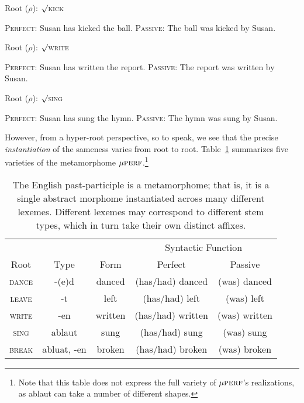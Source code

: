 \begin{exe}
\label{ex:pastpart}
	\ex Root ($\rho$): $\surd$\textsc{kick}
		\begin{xlist} \label{ex:pastpart:kick}
		\ex \textsc{Perfect:} Susan has kicked the ball. \label{ex:pastpart:kick:perf}
		\ex \textsc{Passive:} The ball was kicked by Susan.\label{ex:pastpart:kick:pass}
		\end{xlist}
	\ex Root ($\rho$): $\surd$\textsc{write}
		\begin{xlist} \label{ex:pastpart:write}
		\ex \textsc{Perfect:} Susan has written the report. \label{ex:pastpart:write:perf}
		\ex \textsc{Passive:} The report was written by Susan. \label{ex:pastpart:write:pass}
		\end{xlist}
	\ex Root ($\rho$): $\surd$\textsc{sing}
		\begin{xlist} \label{ex:pastpart:sing}
		\ex \textsc{Perfect:} Susan has sung the hymn. \label{ex:pastpart:sing:perf}
		\ex \textsc{Passive:} The hymn was sung by Susan. \label{ex:pastpart:sing:pass}
		\end{xlist}
\end{exe}
However,
from a hyper-root perspective, so to speak, we see that the precise \emph{instantiation} of the sameness varies from root to root.  
Table~\ref{tab:engpastpart} summarizes five varieties of the metamorphome $\mu{\textsc{perf}}$.\footnote{Note that this table
does not express the full variety of $\mu{\textsc{perf}}$'s realizations, as ablaut can take a number of different shapes.}
\begin{table}[ht]
\centering
\setlength{\extrarowheight}{8pt}
\begin{tabular}{c c c c c}
\toprule
& & & \multicolumn{2}{c}{Syntactic Function} \\[-1ex] 
Root & Type & Form & Perfect & Passive  \\ [0.5ex]
\midrule
\textsc{dance} & -(e)d & danced & (has/had) danced & (was) danced \\
\textsc{leave} & -t & left & (has/had) left & (was) left \\ 
\textsc{write} & -en & written & (has/had) written & (was) written \\
\textsc{sing} & ablaut & sung & (has/had) sung & (was) sung \\
\textsc{break} & abluat, -en & broken & (has/had) broken & (was) broken \\
\bottomrule
\end{tabular}
\label{tab:engpastpart}
\caption{The English past-participle is a metamorphome; that is, it is a single abstract morphome instantiated across many different lexemes. Different lexemes may correspond to different stem types, which in turn take their own distinct affixes.}
\end{table}

